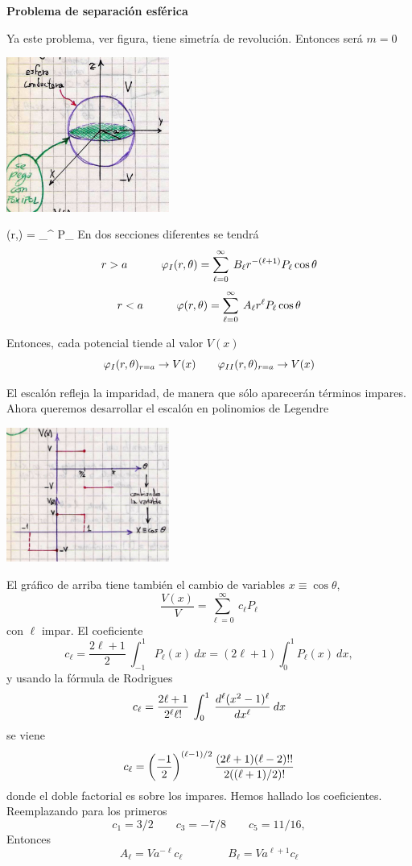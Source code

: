 \documentclass[10pt,oneside]{CBFT_book}
\begin{document}
\begin{ejemplo}{\bf Problema de separación esférica}

Ya este problema, ver figura, tiene simetría de revolución. Entonces será $m = 0$ 

\includegraphics[width=0.4\textwidth]{images/fig_ft1_ejemplo_sep_sphe_A.jpg}

\be
	\vp(r,\theta) = \sum_{}^\infty \:  P_\ell \cos\theta
	\label{potencial_azimutal}
\ee
En dos secciones diferentes se tendrá
\[
	r> a \qquad \quad 
		\vp_I(r,\theta) = \sum_{\ell=0}^\infty \: 
	B_\ell r^{-(\ell+1)} P_\ell \cos\theta
\]
\[
	r< a \qquad \quad 
	\vp(r,\theta) = \sum_{\ell=0}^\infty \:
	A_\ell r^\ell P_\ell \cos\theta
\]

Entonces, cada potencial tiende al valor $V(x)$
\[
	\vp_I(r,\theta)_{r=a} \to V(x) \qquad 
	\vp_{II}(r,\theta)_{r=a} \to V(x)
\]

El escalón refleja la imparidad, de manera que sólo aparecerán
términos impares. Ahora queremos desarrollar el escalón en
polinomios de Legendre

\includegraphics[width=0.4\textwidth]{images/fig_ft1_ejemplo_sep_sphe_B.jpg}

El gráfico de arriba tiene también el cambio de variables $x\equiv \cos\theta$,
\[
	\frac{V(x)}{V} = \sum_{\ell=0}^\infty \: c_\ell P_\ell 
\]
con $\ell$ impar. El coeficiente 
\[
	c_\ell = \frac{2\ell + 1}{2} \: \int_{-1}^{1} P_\ell (x) \: dx
	= ( 2 \ell + 1 ) \int_{0}^{1} P_\ell (x) \: dx,
\]
y usando la fórmula de Rodrigues
\[
	c_\ell = \frac{2\ell + 1}{2^\ell \ell! } \: 
	\int_{0}^{1} \: \dtot[\ell]{ ( x^2 - 1 )^\ell }{x} \: dx
\]
se viene 
\[
	c_\ell = \Frac{-1}{2}^{(\ell -1)/ 2}
	\frac{(2\ell +1)(\ell -2)!!}{2((\ell+1)/2)!}
\]
donde el doble factorial es sobre los impares. Hemos hallado los coeficientes.
Reemplazando para los primeros
\[
	c_1 = 3/2 \qquad c_3 = -7/8 \qquad c_5 = 11/16,
\]
Entonces 
\[
	A_\ell = V a^{-\ell} c_\ell \qquad \qquad 
	B_\ell = V a^{\ell+1} c_\ell
\]

\end{ejemplo}
\end{document}
